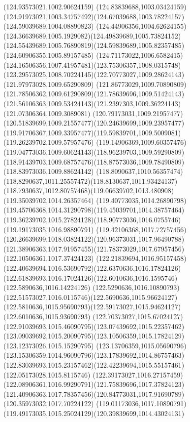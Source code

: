 {{	\lineto(124.93573021,1002.90624159)
	\lineto(124.83839688,1003.03424159)
	\curveto(124.91973021,1003.34757492)(124.67039688,1003.78224157)(124.59039689,1004.08890823)
	\curveto(124.44906356,1004.62624155)(124.36639689,1005.1929082)(124.49839689,1005.73824152)
	\curveto(124.55439689,1005.76890819)(124.59839689,1005.82357485)(124.60906355,1005.89157485)
	\curveto(124.71173022,1006.6582415)(124.16506356,1007.41957481)(123.75306357,1008.0315748)
	\curveto(123.29573025,1008.70224145)(122.70773027,1009.28624143)(121.97973028,1009.65290809)
	\curveto(121.86773029,1009.70890809)(121.78506362,1009.61290809)(121.78639696,1009.51424143)
	\curveto(121.56106363,1009.53424143)(121.2397303,1009.36224143)(121.07306364,1009.3089081)
	\curveto(120.79173031,1009.21957477)(120.51839699,1009.21557477)(120.24639699,1009.23957477)
	\curveto(119.91706367,1009.33957477)(119.59839701,1009.5009081)(119.26239702,1009.57957476)
	\curveto(119.14906369,1009.60357476)(119.04773036,1009.60624143)(118.96239703,1009.59290809)
	\curveto(118.91439703,1009.68757476)(118.87573036,1009.78490809)(118.83973036,1009.88624142)
	\curveto(118.8090637,1010.56357474)(118.8290637,1011.25557472)(118.8130637,1011.93424137)
	\curveto(118.7930637,1012.80757468)(119.06639702,1013.480908)(119.35039702,1014.26357464)
	\curveto(119.40773035,1014.26890798)(119.45706368,1014.31290798)(119.45039701,1014.38757464)
	\curveto(119.36239702,1015.27824128)(118.90773036,1016.0755746)(119.19173035,1016.98890791)
	\curveto(119.42106368,1017.72757456)(120.26639699,1018.03824122)(120.96373031,1017.96490788)
	\curveto(121.38906363,1017.91957455)(121.78373029,1017.67957456)(122.10506361,1017.37424123)
	\curveto(122.21839694,1016.95157458)(122.40639694,1016.53690792)(122.6370636,1016.17824126)
	\curveto(122.61839693,1016.17024126)(122.6010636,1016.1595746)(122.5890636,1016.14224126)
	\curveto(122.5290636,1016.10890793)(122.51573027,1016.0115746)(122.5690636,1015.96624127)
	\curveto(122.5810636,1015.95690793)(122.59173027,1015.94624127)(122.6010636,1015.93690793)
	\curveto(122.70373027,1015.67024127)(122.91039693,1015.46090795)(123.07439692,1015.22357462)
	\curveto(123.09039692,1015.20090795)(123.10506359,1015.17824129)(123.12373026,1015.15290795)
	\curveto(123.13706359,1015.05690796)(123.15306359,1014.96090796)(123.17839692,1014.86757463)
	\curveto(122.83039693,1015.23157462)(122.42239694,1015.55157461)(122.05173028,1015.8115746)
	\curveto(122.39173027,1016.27157459)(122.08906361,1016.99290791)(121.75839696,1017.37824123)
	\curveto(121.40906363,1017.78357456)(120.84773031,1017.91690789)(120.35973032,1017.70224122)
	\curveto(119.01173036,1017.10890791)(119.49173035,1015.25024129)(120.39839699,1014.43024131)
}}
